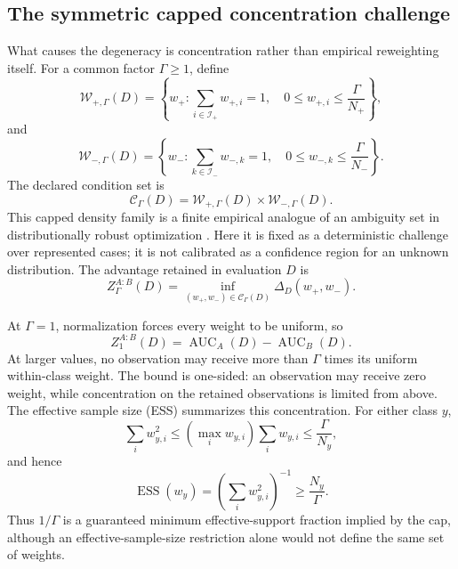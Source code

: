 \documentclass[11pt]{article}
\newcommand{\CSet}{\mathcal{C}}
\theoremstyle{remark}
\begin{document}
\subsection{The symmetric capped concentration challenge}

What causes the degeneracy is concentration rather than empirical reweighting
itself. For a common factor $\Gamma\geq1$, define
\begin{equation}
\mathcal W_{+,\Gamma}(D)
=
\left\{
w_+:
\sum_{i\in\mathcal I_+}w_{+,i}=1,\quad
0\leq w_{+,i}\leq\frac{\Gamma}{N_+}
\right\},
\label{eq:auroc-positive-weights}
\end{equation}
and
\begin{equation}
\mathcal W_{-,\Gamma}(D)
=
\left\{
w_-:
\sum_{k\in\mathcal I_-}w_{-,k}=1,\quad
0\leq w_{-,k}\leq\frac{\Gamma}{N_-}
\right\}.
\label{eq:auroc-negative-weights}
\end{equation}
The declared condition set is
\[
\CSet_\Gamma(D)
=
\mathcal W_{+,\Gamma}(D)\times\mathcal W_{-,\Gamma}(D).
\]
This capped density family is a finite empirical analogue of an ambiguity set
in distributionally robust optimization \cite{shapiro2017distributionally,bental2013robust}.
Here it is fixed as a deterministic challenge over represented cases; it is not
calibrated as a confidence region for an unknown distribution.
The advantage retained in evaluation $D$ is
\begin{equation}
Z_\Gamma^{A:B}(D)
=
\inf_{(w_+,w_-)\in\CSet_\Gamma(D)}
\Delta_D(w_+,w_-).
\label{eq:auroc-z-gamma}
\end{equation}

At $\Gamma=1$, normalization forces every weight to be uniform, so
\begin{equation}
Z_1^{A:B}(D)
=
\operatorname{AUC}_A(D)-\operatorname{AUC}_B(D).
\label{eq:auroc-gamma-one}
\end{equation}
At larger values, no observation may receive more than $\Gamma$ times its
uniform within-class weight. The bound is one-sided: an observation may receive
zero weight, while concentration on the retained observations is limited from
above. The effective sample size (ESS) summarizes this concentration. For
either class $y$,
\[
\sum_i w_{y,i}^2
\leq
\left(\max_i w_{y,i}\right)\sum_iw_{y,i}
\leq
\frac{\Gamma}{N_y},
\]
and hence
\begin{equation}
\operatorname{ESS}(w_y)
=
\left(\sum_iw_{y,i}^2\right)^{-1}
\geq
\frac{N_y}{\Gamma}.
\label{eq:auroc-gamma-ess}
\end{equation}
Thus $1/\Gamma$ is a guaranteed minimum effective-support fraction implied by
the cap, although an effective-sample-size restriction alone would not define
the same set of weights.
\end{document}

